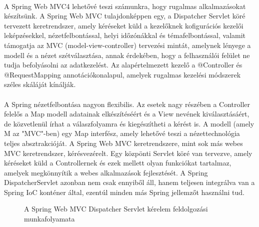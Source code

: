 \paragraph{}
A Spring Web MVC4 lehetővé teszi számunkra, hogy rugalmas alkalmazásokat készítsünk. A Spring Web MVC tulajdonképpen egy, a Dispatcher Servlet köré tervezett keretrendszer, amely kéréseket küld a kezelőknek kofigurációs kezelői leképzésekkel, nézetfelbontással, helyi időzónákkal és témafelbontással, valamit támogatja az MVC (model-view-controller) tervezési mintát, amelynek lényege a modell és a nézet szétválasztása, annak érdekében, hogy a felhasználói felület ne tudja befolyásolni az adatkezelést. Az alapértelmezett kezelő a @Controller és @RequestMapping annotációkonalapul, amelyek rugalmas kezelési módszerek széles skáláját kínálják. 

\paragraph{}
A Spring nézetfelbontása nagyon flexibilis. Az esetek nagy részében a Controller felelős a Map modell adatainak elkészítéséért és a View nevének kiválasztásáért, de közvetlenül írhat a válaszfolyamra és kiegészítheti a kérést is. A modell (amely M az "MVC"-ben) egy Map interfész, amely lehetővé teszi a nézettechnológia teljes absztrakcióját. A Spring Web MVC keretrendszere, mint sok más webes MVC keretrendszer, kérésvezérelt. Egy közpönti Servlet köré van tervezve, amely kéréseket küld a Controllernek és ezek mellett olyan funkciókat tartalmaz, amelyek megkönnyítik a webes alkalmazások fejlesztését. A Spring DispatcherServlet azonban nem csak ennyiből áll, hanem teljesen integrálva van a Spring IoC konténer által, ezentúl minden más Spring jellemzőt használni tud.

\begin{figure}[t]
  \centering
  \caption[A neuron]%
  { A Spring Web MVC Dispatcher Servlet kérelem feldolgozási munkafolyamata }
  \label{fig:ALAP:sm1}
\end{figure}
